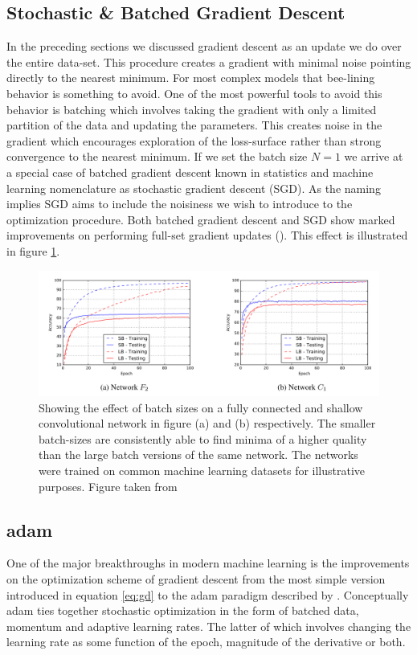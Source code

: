 \subsection{Stochastic \& Batched Gradient Descent}
In the preceding sections we discussed gradient descent as an update we do over the entire data-set. This procedure creates a gradient with minimal noise pointing directly to the nearest minimum. For most complex models that bee-lining behavior is something to avoid. One of the most powerful tools to avoid this behavior is batching which involves taking the gradient with only a limited partition of the data and updating the parameters. This creates noise in the gradient which encourages exploration of the loss-surface rather than strong convergence to the nearest minimum. If we set the batch size $N=1$ we arrive at a special case of batched gradient descent known in statistics and machine learning nomenclature as stochastic gradient descent (SGD). As the naming implies SGD aims to include the noisiness we wish to introduce to the optimization procedure. Both batched gradient descent and SGD show marked improvements on performing full-set gradient updates (\cite{Keskar2016}). This effect is illustrated in figure \ref{fig:batch_size}. 

\begin{figure}[H]
\centering
\includegraphics[width=\textwidth]{../figures/batch_size_plots}
\caption{Showing the effect of batch sizes on a fully connected and shallow convolutional network in figure (a) and (b) respectively. The smaller batch-sizes are consistently able to find minima of a higher quality than the large batch versions of the same network. The networks were trained on common machine learning datasets for illustrative purposes. Figure taken from \citet{Keskar2016} }\label{fig:batch_size}
\end{figure}

\subsection{adam}\label{sec:adam}
One of the major breakthroughs in modern machine learning is the improvements on the optimization scheme of gradient descent from the most simple version introduced in equation \ref{eq:gd} to the adam paradigm described by \citet{Kingma2015}. Conceptually adam ties together stochastic optimization in the form of batched data, momentum and adaptive learning rates. The latter of which involves changing the learning rate as some function of the epoch, magnitude of the derivative or both. 

